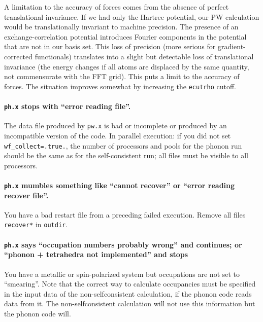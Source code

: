 \documentclass[12pt,a4paper]{article}
\begin{document}
A limitation to the accuracy of forces comes from the absence of
perfect translational invariance.  If we had only the Hartree
potential, our PW calculation would be translationally invariant to
machine precision.  The presence of an exchange-correlation potential
introduces Fourier components in the potential that are not in our
basis set.  This loss of precision (more serious for
gradient-corrected functionals) translates into a slight but
detectable loss of translational invariance (the energy changes if all
atoms are displaced by the same quantity, not commensurate with the
FFT grid).  This puts a limit to the accuracy of forces.  The
situation improves somewhat by increasing the \texttt{ecutrho} cutoff.

\paragraph{\texttt{ph.x} stops with ``error reading file''.}

The data file produced by \texttt{pw.x} is bad or incomplete or
produced by an incompatible version of the code.
In parallel execution: if you did not set \texttt{wf\_collect=.true.},
the number of processors and pools for the phonon run should be the 
same as for the self-consistent run; all files must be visible to all 
processors.

\paragraph{\texttt{ph.x} mumbles something like ``cannot recover'' or
           ``error reading recover file''.}

You have a bad restart file from a preceding failed execution.
Remove all files \texttt{recover*} in \texttt{outdir}.

\paragraph{\texttt{ph.x} says ``occupation numbers probably wrong''
and continues; or ``phonon + tetrahedra not implemented'' and stops}

You have a metallic or spin-polarized system but occupations are not 
set to ``smearing''. Note that the correct way to calculate occupancies 
must be specified in the input data of the non-selfconsistent 
calculation, if the phonon code reads data from it. The non-selfconsistent 
calculation will not use this information but the phonon code will.
\end{document}
